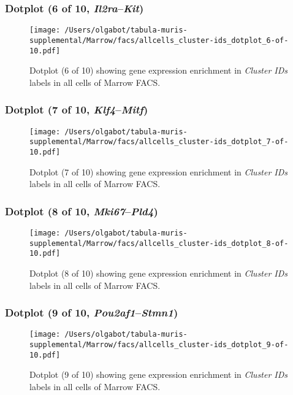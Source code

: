 \clearpage

\subsubsection{Dotplot (6 of 10, \emph{Il2ra}--\emph{Kit})}
\begin{figure}[h]
\centering
\texttt{[image: /Users/olgabot/tabula-muris-supplemental/Marrow/facs/allcells\_cluster-ids\_dotplot\_6-of-10.pdf]}

\caption{ Dotplot (6 of 10)  showing gene expression enrichment in \emph{Cluster IDs} labels in all cells of Marrow FACS. }
\end{figure}


\clearpage

\subsubsection{Dotplot (7 of 10, \emph{Klf4}--\emph{Mitf})}
\begin{figure}[h]
\centering
\texttt{[image: /Users/olgabot/tabula-muris-supplemental/Marrow/facs/allcells\_cluster-ids\_dotplot\_7-of-10.pdf]}

\caption{ Dotplot (7 of 10)  showing gene expression enrichment in \emph{Cluster IDs} labels in all cells of Marrow FACS. }
\end{figure}


\clearpage

\subsubsection{Dotplot (8 of 10, \emph{Mki67}--\emph{Pld4})}
\begin{figure}[h]
\centering
\texttt{[image: /Users/olgabot/tabula-muris-supplemental/Marrow/facs/allcells\_cluster-ids\_dotplot\_8-of-10.pdf]}

\caption{ Dotplot (8 of 10)  showing gene expression enrichment in \emph{Cluster IDs} labels in all cells of Marrow FACS. }
\end{figure}


\clearpage

\subsubsection{Dotplot (9 of 10, \emph{Pou2af1}--\emph{Stmn1})}
\begin{figure}[h]
\centering
\texttt{[image: /Users/olgabot/tabula-muris-supplemental/Marrow/facs/allcells\_cluster-ids\_dotplot\_9-of-10.pdf]}

\caption{ Dotplot (9 of 10)  showing gene expression enrichment in \emph{Cluster IDs} labels in all cells of Marrow FACS. }
\end{figure}


